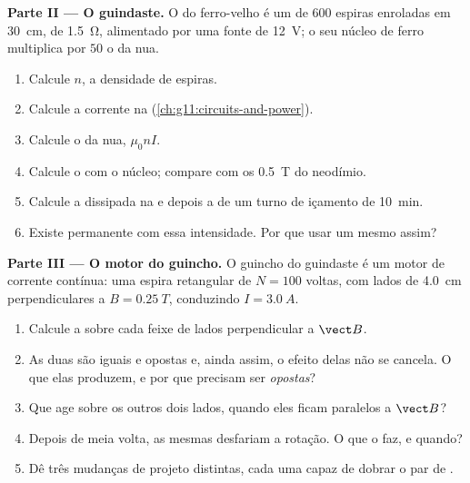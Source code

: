 \begin{problem}
\medskip
\noindent\textbf{Parte II --- O guindaste.}
O  do ferro-velho é um  de $600$ espiras enroladas em
\qty{30}{cm}, de  \qty{1.5}{\ohm}, alimentado por uma fonte de
\qty{12}{V}; o seu núcleo de ferro multiplica por $50$ o  da 
nua.
\begin{enumerate}[resume]
  \item Calcule $n$, a densidade de espiras.
  \item Calcule a corrente na 
        (\cref{ch:g11:circuits-and-power}).
  \item Calcule o  da  nua, $\mu_0 n I$.
  \item Calcule o  com o núcleo; compare com os \qty{0.5}{T} do
        neodímio.
  \item Calcule a  dissipada na  e depois a  de um
        turno de içamento de \qty{10}{\minute}.
  \item Existe  permanente com essa intensidade. Por que usar um
         mesmo assim?
\end{enumerate}

\medskip
\noindent\textbf{Parte III --- O motor do guincho.}
O guincho do guindaste é um motor de corrente contínua: uma espira
retangular de $N = 100$ voltas, com lados de \qty{4.0}{cm}
perpendiculares a $B = \qty{0.25}{T}$, conduzindo $I = \qty{3.0}{A}$.
\begin{enumerate}[resume]
  \item Calcule a  sobre cada feixe de lados
        perpendicular a $\vect B$.
  \item As duas  são iguais e opostas e, ainda assim, o efeito
        delas não se cancela. O que elas produzem, e por que precisam ser
        \emph{opostas}?
  \item Que  age sobre os outros dois lados, quando eles ficam
        paralelos a $\vect B$?
  \item Depois de meia volta, as mesmas  desfariam a rotação. O que
        o  faz, e quando?
  \item Dê três mudanças de projeto distintas, cada uma capaz de dobrar o
        par de .
\end{enumerate}


\end{problem}
